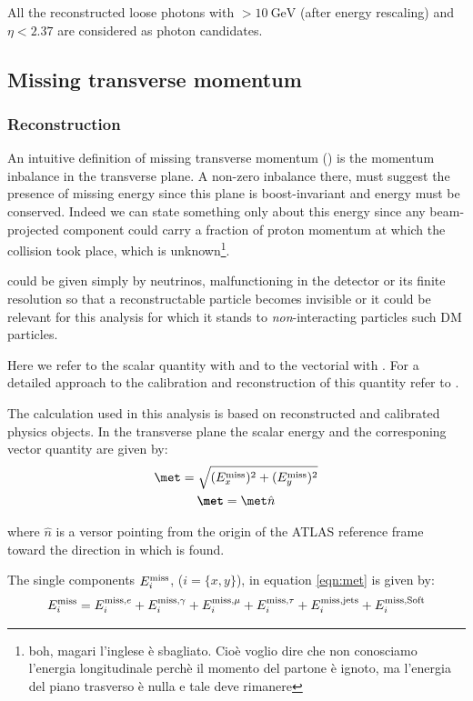 All the reconstructed loose photons with \ET $> \SI{10}{\GeV}$ (after energy rescaling) and $\eta<2.37$ are considered as photon candidates.


\subsection{Missing transverse momentum}
\subsubsection{Reconstruction}

An intuitive definition of missing transverse momentum (\met) is the momentum inbalance in the transverse plane. A non-zero inbalance there, must suggest the presence of missing energy since this plane is boost-invariant and energy must be conserved. Indeed we can state something only about this energy since any beam-projected component could carry a fraction of proton momentum at which the collision took place, which is unknown\footnote{boh, magari l'inglese \`e sbagliato. Cio\`e voglio dire che non conosciamo l'energia longitudinale perch\`e il momento del partone \`e ignoto, ma l'energia del piano trasverso \`e nulla e tale deve rimanere}.

\met could be given simply by neutrinos, malfunctioning in the detector or its finite resolution so that a reconstructable particle becomes invisible or it could be relevant for this analysis for which it stands to \emph{non}-interacting particles such DM particles.

Here we refer to the scalar quantity with \met and to the vectorial with \textbf{\met}. For a detailed approach to the calibration and reconstruction of this quantity refer to \cite{met}.

The \met calculation used in this analysis is based on reconstructed and calibrated physics objects. In the transverse plane the scalar energy and the corresponing vector quantity are given by:
\begin{gather}
\label{eqn:met}
	\met=\sqrt{(E_x^\textup{miss})^2+(E_y^\textup{miss})^2}\\
	\textbf{\met}=\met \hat{n}
\end{gather}

where $\hat{n}$ is a versor pointing from the origin of the ATLAS reference frame toward the direction in which \met is found.

The single components $E_i^\textup{miss}$, ($i=\{x,y\}$), in equation \ref{eqn:met} is given by:
\begin{equation}
	E_i^\textup{miss}=E_i^\textup{miss,$e$}+E_i^\textup{miss,$\gamma$}+E_i^\textup{miss,$\mu$}+E_i^\textup{miss,$\tau$}+E_i^\textup{miss,jets}+E_i^\textup{miss,Soft}
\end{equation}


